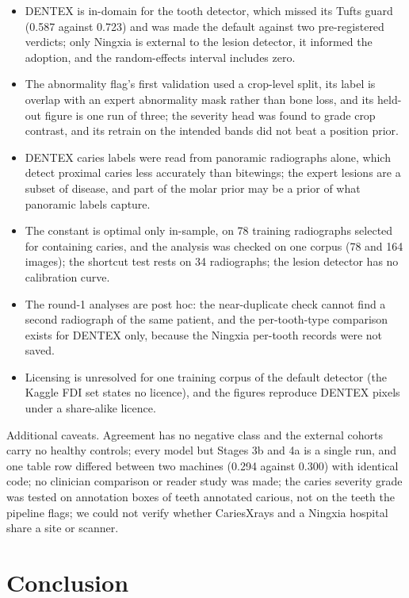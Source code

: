 \documentclass[conference]{IEEEtran}
\begin{document}
\begin{itemize}
\item DENTEX is in-domain for the tooth detector, which missed its Tufts guard (0.587 against 0.723) and was made the default against two pre-registered verdicts; only Ningxia is external to the lesion detector, it informed the adoption, and the random-effects interval includes zero.
\item The abnormality flag's first validation used a crop-level split, its label is overlap with an expert abnormality mask rather than bone loss, and its held-out figure is one run of three; the severity head was found to grade crop contrast, and its retrain on the intended bands did not beat a position prior.
\item DENTEX caries labels were read from panoramic radiographs alone, which detect proximal caries less accurately than bitewings; the expert lesions are a subset of disease, and part of the molar prior may be a prior of what panoramic labels capture.
\item The constant is optimal only in-sample, on 78 training radiographs selected for containing caries, and the analysis was checked on one corpus (78 and 164 images); the shortcut test rests on 34 radiographs; the lesion detector has no calibration curve.
\item The round-1 analyses are post hoc: the near-duplicate check cannot find a second radiograph of the same patient, and the per-tooth-type comparison exists for DENTEX only, because the Ningxia per-tooth records were not saved.
\item Licensing is unresolved for one training corpus of the default detector (the Kaggle FDI set states no licence), and the figures reproduce DENTEX pixels under a share-alike licence.
\end{itemize}

Additional caveats. Agreement has no negative class and the external cohorts carry no healthy controls; every model but Stages 3b and 4a is a single run, and one table row differed between two machines (0.294 against 0.300) with identical code; no clinician comparison or reader study was made; the caries severity grade was tested on annotation boxes of teeth annotated carious, not on the teeth the pipeline flags; we could not verify whether CariesXrays and a Ningxia hospital share a site or scanner.

\section{Conclusion}
\end{document}
